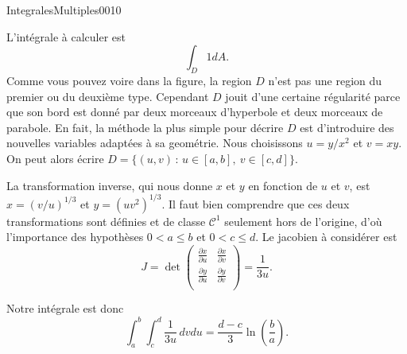 \begin{corrige}{IntegralesMultiples0010}

L'intégrale à calculer est 
\[
\int_{D} 1 dA.
\] 
Comme vous pouvez voire dans la figure, la region $D$ n'est pas une region du premier ou du deuxième type. Cependant $D$ jouit d'une certaine régularité parce que son bord est donné par deux morceaux d'hyperbole et deux morceaux de parabole. En fait, la méthode la plus simple pour décrire $D$ est d'introduire des nouvelles variables adaptées à sa geométrie. Nous choisissons $u=y/x^2$ et $v=xy$. On peut alors écrire $D=\{(u,v) \,:\, u\in[a,b], \: v\in[c,d]\}$. 

La transformation inverse, qui nous donne $x$ et $y$ en fonction de $u$ et $v$, est $x=(v/u)^{1/3}$ et $y=(uv^2)^{1/3}$. Il faut bien comprendre que ces deux transformations sont définies et de classe $\mathcal{C}^1$ seulement hors de l'origine, d'où l'importance des hypothèses  $0< a\leq b$ et $0< c\leq d$. Le jacobien à considérer est 
\begin{equation}
  J=\det
  \begin{pmatrix}
    \frac{\partial x}{\partial u} & \frac{\partial x}{\partial v}\\
\frac{\partial y}{\partial u} & \frac{\partial y}{\partial v}\\
  \end{pmatrix}=\frac{1}{3u}.
\end{equation}

Notre intégrale est donc 
\[
\int_a^b\int_c^d\frac{1}{3u}\, dv du= \frac{d-c}{3}\ln\left(\frac{b}{a}\right).
\] 
\end{corrige}

